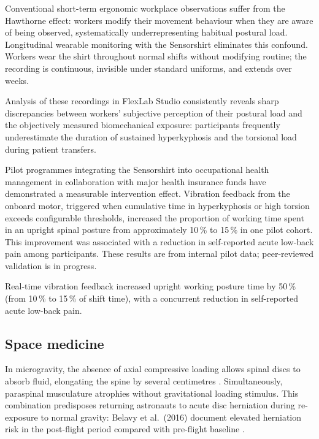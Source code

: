 Conventional short-term ergonomic workplace observations suffer from the Hawthorne
effect: workers modify their movement behaviour when they are aware of being observed,
systematically underrepresenting habitual postural load.
Longitudinal wearable monitoring with the Sensorshirt eliminates this confound.
Workers wear the shirt throughout normal shifts without modifying routine; the
recording is continuous, invisible under standard uniforms, and extends over weeks.

Analysis of these recordings in FlexLab Studio consistently reveals sharp
discrepancies between workers' subjective perception of their postural load and the
objectively measured biomechanical exposure: participants frequently underestimate the
duration of sustained hyperkyphosis and the torsional load during patient transfers.

Pilot programmes integrating the Sensorshirt into occupational health management in
collaboration with major health insurance funds have demonstrated a measurable
intervention effect.
Vibration feedback from the onboard motor, triggered when cumulative time in
hyperkyphosis or high torsion exceeds configurable thresholds, increased the proportion
of working time spent in an upright spinal posture from approximately 10\,\% to
15\,\% in one pilot cohort.
This improvement was associated with a reduction in self-reported acute low-back pain
among participants.
These results are from internal pilot data; peer-reviewed validation is in progress.

\begin{factboxlavender}
    Real-time vibration feedback increased upright working posture time by 50\,\%
    (from 10\,\% to 15\,\% of shift time), with a concurrent reduction in
    self-reported acute low-back pain.
\end{factboxlavender}

\subsection{Space medicine}

In microgravity, the absence of axial compressive loading allows spinal discs to
absorb fluid, elongating the spine by several centimetres \cite{belavy2016}.
Simultaneously, paraspinal musculature atrophies without gravitational loading stimulus.
This combination predisposes returning astronauts to acute disc herniation during
re-exposure to normal gravity: Belavy et al.\ (2016) document elevated herniation risk
in the post-flight period compared with pre-flight baseline \cite{belavy2016}.

